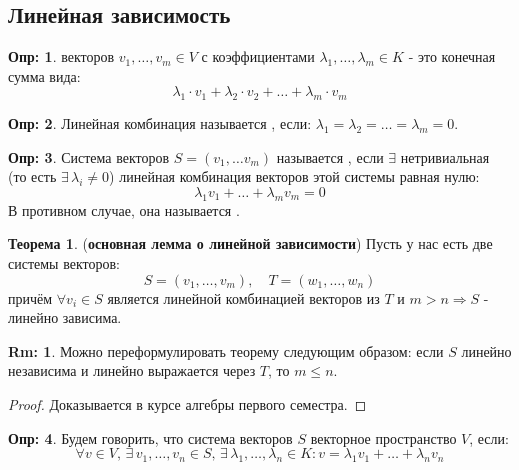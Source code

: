 \documentclass[12pt]{article}
\theoremstyle{definition}
\newtheorem{defn}{Опр:}
\newtheorem{rem}{Rm:}
\newtheorem{theorem}{Теорема}
\begin{document}
\subsection*{Линейная зависимость}
\begin{defn}
	 векторов $v_1,\dotsc, v_m \in V$ с коэффициентами $\lambda_1, \dotsc, \lambda_m \in K$ - это конечная сумма вида:
	$$
		\lambda_1 {\cdot}v_1 + \lambda_2{\cdot} v_2 + \dotsc + \lambda_m{\cdot}v_m
	$$
\end{defn}
\begin{defn}
	Линейная комбинация называется , если: $\lambda_1 = \lambda_2 = \dotsc = \lambda_m = 0$.
\end{defn}

\begin{defn}
	Система векторов $S = (v_1, \dotsc v_m)$ называется , если $\exists$ нетривиальная (то есть $\exists \, \lambda_i \neq 0$) линейная комбинация векторов этой системы равная нулю:
	$$
		\lambda_1 v_1 + \dotsc + \lambda_m v_m = 0
	$$
	В противном случае, она называется .
\end{defn}
\begin{theorem}(\textbf{основная лемма о линейной зависимости})
	Пусть у нас есть две системы векторов: 
	$$
		S = (v_1, \dotsc, v_m), \quad T = (w_1,\dotsc, w_n)
	$$
	причём $\forall v_i \in S$ является линейной комбинацией векторов из $T$ и $m > n \Rightarrow S$ - линейно зависима.
\end{theorem}
\begin{rem}
	Можно переформулировать теорему следующим образом: если $S$ линейно независима и линейно выражается через $T$, то $m \leq n$.
\end{rem}
\begin{proof}
	Доказывается в курсе алгебры первого семестра.
\end{proof}

\begin{defn}
	Будем говорить, что система векторов $S$  векторное пространство $V$, если:
	$$
		\forall v \in V, \, \exists \, v_1,\dotsc, v_n \in S, \, \exists \, \lambda_1, \dotsc, \lambda_n \in K \colon v = \lambda_1 v_1 + \dotsc + \lambda_n v_n
	$$
\end{defn}
\end{document}
